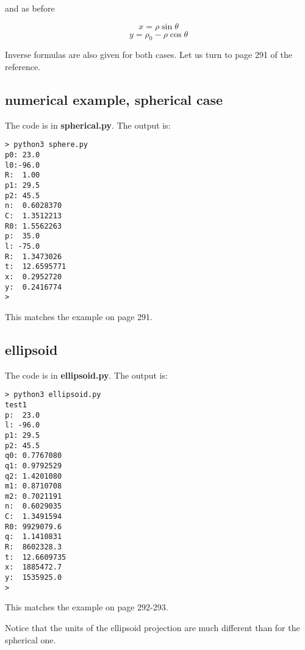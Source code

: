 \documentclass[11pt, oneside]{article}
\begin{document}
and as before

\[ x = \rho \sin \theta \]
\[ y = \rho_0 - \rho \cos \theta \]

Inverse formulas are also given for both cases.  Let us turn to page 291 of the reference.

\subsection*{numerical example, spherical case}

The code is in \textbf{spherical.py}.  The output is:

\begin{verbatim}
> python3 sphere.py  
p0: 23.0
l0:-96.0
R:  1.00
p1: 29.5
p2: 45.5
n:  0.6028370
C:  1.3512213
R0: 1.5562263
p:  35.0
l: -75.0
R:  1.3473026
t:  12.6595771
x:  0.2952720
y:  0.2416774
>
\end{verbatim}

This matches the example on page 291.

\subsection*{ellipsoid}

The code is in \textbf{ellipsoid.py}.  The output is:

\begin{verbatim}
> python3 ellipsoid.py
test1
p:  23.0
l: -96.0
p1: 29.5
p2: 45.5
q0: 0.7767080
q1: 0.9792529
q2: 1.4201080
m1: 0.8710708
m2: 0.7021191
n:  0.6029035
C:  1.3491594
R0: 9929079.6
q:  1.1410831
R:  8602328.3
t:  12.6609735
x:  1885472.7
y:  1535925.0
>
\end{verbatim}

This matches the example on page 292-293.

Notice that the units of the ellipsoid projection are much different than for the spherical one.
\end{document}
